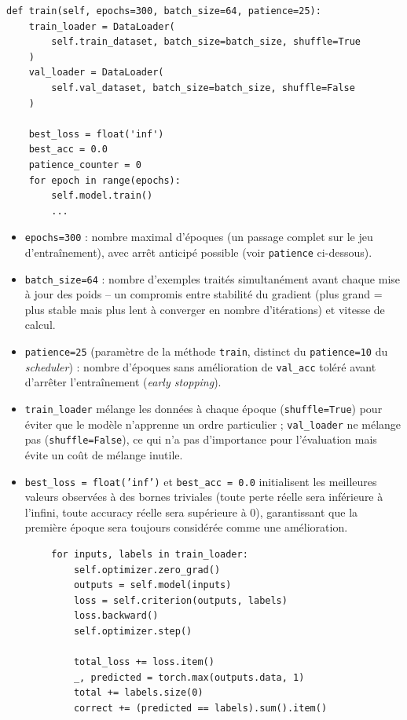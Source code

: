 \documentclass[a4paper,12pt]{article}
\begin{document}
\begin{lstlisting}
def train(self, epochs=300, batch_size=64, patience=25):
    train_loader = DataLoader(
        self.train_dataset, batch_size=batch_size, shuffle=True
    )
    val_loader = DataLoader(
        self.val_dataset, batch_size=batch_size, shuffle=False
    )

    best_loss = float('inf')
    best_acc = 0.0
    patience_counter = 0
    for epoch in range(epochs):
        self.model.train()
        ...
\end{lstlisting}

\begin{itemize}
    \item \texttt{epochs=300} : nombre maximal d'époques (un passage
    complet sur le jeu d'entraînement), avec arrêt anticipé possible
    (voir \texttt{patience} ci-dessous).
    \item \texttt{batch\_size=64} : nombre d'exemples traités
    simultanément avant chaque mise à jour des poids -- un compromis
    entre stabilité du gradient (plus grand = plus stable mais plus lent
    à converger en nombre d'itérations) et vitesse de calcul.
    \item \texttt{patience=25} (paramètre de la méthode \texttt{train},
    distinct du \texttt{patience=10} du \emph{scheduler}) : nombre
    d'époques sans amélioration de \texttt{val\_acc} toléré avant
    d'arrêter l'entraînement (\emph{early stopping}).
    \item \texttt{train\_loader} mélange les données à chaque époque
    (\texttt{shuffle=True}) pour éviter que le modèle n'apprenne un ordre
    particulier ; \texttt{val\_loader} ne mélange pas
    (\texttt{shuffle=False}), ce qui n'a pas d'importance pour l'évaluation
    mais évite un coût de mélange inutile.
    \item \texttt{best\_loss = float('inf')} et \texttt{best\_acc = 0.0}
    initialisent les meilleures valeurs observées à des bornes triviales
    (toute perte réelle sera inférieure à l'infini, toute accuracy réelle
    sera supérieure à 0), garantissant que la première époque sera
    toujours considérée comme une amélioration.
\end{itemize}

\begin{lstlisting}
        for inputs, labels in train_loader:
            self.optimizer.zero_grad()
            outputs = self.model(inputs)
            loss = self.criterion(outputs, labels)
            loss.backward()
            self.optimizer.step()

            total_loss += loss.item()
            _, predicted = torch.max(outputs.data, 1)
            total += labels.size(0)
            correct += (predicted == labels).sum().item()
\end{lstlisting}
\end{document}
